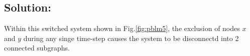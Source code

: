 \documentclass[]{article}
\numberwithin{equation}{section}
\renewcommand{\figurename}{Fig.}
\newtheorem{definition}{Definition}
\begin{document}
\subsection*{Solution:}
Within this switched system shown in \figurename \ref{fig:pblm5}, the exclusion of nodes $x$ and $y$ during any singe time-step causes the system to be disconnectd into 2 connected subgraphs. 












\end{document}
